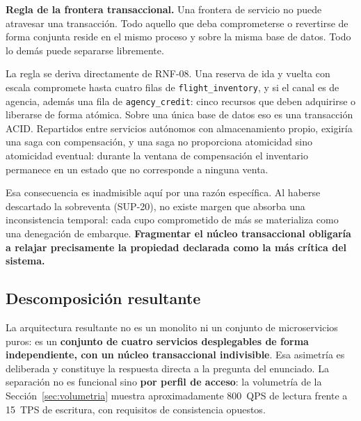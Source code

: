 \documentclass[10pt,letterpaper]{article}
\newcommand{\nota}[1]{%
  \begin{tcolorbox}[colback=cajaFondo,colframe=usaAzul!60,sharp corners=south]#1\end{tcolorbox}}
\begin{document}
\nota{\textbf{Regla de la frontera transaccional.} Una frontera de servicio no puede atravesar una transacción. Todo aquello que deba comprometerse o revertirse de forma conjunta reside en el mismo proceso y sobre la misma base de datos. Todo lo demás puede separarse libremente.}

La regla se deriva directamente de RNF-08. Una reserva de ida y vuelta con escala compromete hasta cuatro filas de \texttt{flight\_inventory}, y si el canal es de agencia, además una fila de \texttt{agency\_credit}: cinco recursos que deben adquirirse o liberarse de forma atómica. Sobre una única base de datos eso es una transacción ACID. Repartidos entre servicios autónomos con almacenamiento propio, exigiría una saga con compensación, y una saga no proporciona atomicidad sino atomicidad eventual: durante la ventana de compensación el inventario permanece en un estado que no corresponde a ninguna venta.

Esa consecuencia es inadmisible aquí por una razón específica. Al haberse descartado la sobreventa (SUP-20), no existe margen que absorba una inconsistencia temporal: cada cupo comprometido de más se materializa como una denegación de embarque. \textbf{Fragmentar el núcleo transaccional obligaría a relajar precisamente la propiedad declarada como la más crítica del sistema.}

\subsection{Descomposición resultante}
La arquitectura resultante no es un monolito ni un conjunto de microservicios puros: es un \textbf{conjunto de cuatro servicios desplegables de forma independiente, con un núcleo transaccional indivisible}. Esa asimetría es deliberada y constituye la respuesta directa a la pregunta del enunciado. La separación no es funcional sino \textbf{por perfil de acceso}: la volumetría de la Sección~\ref{sec:volumetria} muestra aproximadamente 800~QPS de lectura frente a 15~TPS de escritura, con requisitos de consistencia opuestos.
\end{document}
